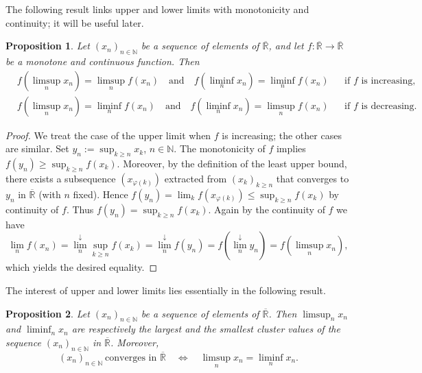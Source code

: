 \documentclass[11pt]{article}
\newtheorem{proposition}{Proposition}[section]
\theoremstyle{definition}
\begin{document}
The following result links upper and lower limits with monotonicity and continuity; it will be useful later.

\begin{proposition}
Let $(x_n)_{n\in\mathbb{N}}$ be a sequence of elements of $\overline{\mathbb{R}}$, and let $f:\overline{\mathbb{R}}\to\overline{\mathbb{R}}$ be a monotone and continuous function.
Then
\[
\begin{aligned}
&f\!\left(\limsup_{n} x_n\right)=\limsup_{n} f(x_n)
\quad\text{and}\quad
f\!\left(\liminf_{n} x_n\right)=\liminf_{n} f(x_n)
&&\text{if $f$ is increasing,}\\
&f\!\left(\limsup_{n} x_n\right)=\liminf_{n} f(x_n)
\quad\text{and}\quad
f\!\left(\liminf_{n} x_n\right)=\limsup_{n} f(x_n)
&&\text{if $f$ is decreasing.}
\end{aligned}
\]
\end{proposition}

\begin{proof}
We treat the case of the upper limit when $f$ is increasing; the other cases are similar.
Set $y_n:=\sup_{k\ge n} x_k$, $n\in\mathbb{N}$.
The monotonicity of $f$ implies $f(y_n)\ge \sup_{k\ge n} f(x_k)$.
Moreover, by the definition of the least upper bound, there exists a subsequence $(x_{\varphi(k)})$ extracted from $(x_k)_{k\ge n}$ that converges to $y_n$ in $\overline{\mathbb{R}}$ (with $n$ fixed).
Hence $f(y_n)=\lim_{k} f(x_{\varphi(k)})\le \sup_{k\ge n} f(x_k)$ by continuity of $f$.
Thus $f(y_n)=\sup_{k\ge n} f(x_k)$.
Again by the continuity of $f$ we have
\[
\lim_{n} f(x_n)=\lim_{n}^{\downarrow}\sup_{k\ge n} f(x_k)=\lim_{n}^{\downarrow} f(y_n)=f\!\left(\lim_{n}^{\downarrow} y_n\right)=f\!\left(\limsup_{n} x_n\right),
\]
which yields the desired equality.
\end{proof}

The interest of upper and lower limits lies essentially in the following result.

\begin{proposition}
Let $(x_n)_{n\in\mathbb{N}}$ be a sequence of elements of $\overline{\mathbb{R}}$.
Then $\limsup_{n} x_n$ and $\liminf_{n} x_n$ are respectively the largest and the smallest cluster values of the sequence $(x_n)_{n\in\mathbb{N}}$ in $\overline{\mathbb{R}}$.
Moreover,
\[
(x_n)_{n\in\mathbb{N}}\ \text{converges in }\overline{\mathbb{R}}
\quad\Longleftrightarrow\quad
\limsup_{n} x_n=\liminf_{n} x_n .
\]
\end{proposition}
\end{document}
